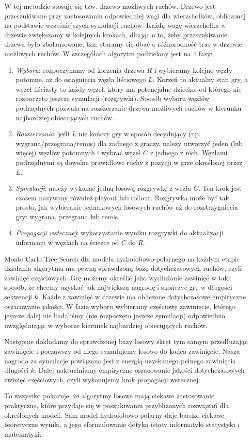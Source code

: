 \documentclass[leqno,10pt]{article}
\begin{document}
W tej metodzie stosuję się tzw. drzewo możliwych ruchów. Drzewo jest przeszukiwane przy zastosowaniu odpowiedniej wagi dla wierzchołków, obliczonej na podstawie wcześniejszych symulacji ruchów. Każdą wagę wierzchołka w drzewie zwiększamy w kolejnych krokach, dbając o to, żeby przeszukiwanie drzewa było zbalansowane, tzn. staramy się dbać o różnorodność tras w drzewie możliwych ruchów. W szczegółach algorytm podzielony jest na 4 fazy: 
\begin{enumerate}
\item \textit{Wyboru}: rozpoczynamy od korzenia drzewa $R$ i wybieramy kolejne węzły potomne, aż do osiągnięcia węzła liściowego $L$. Korzeń to aktualny stan gry, a węzeł liściasty to każdy węzeł, który ma potencjalne dziecko, od którego nie rozpoczęto jeszcze symulacji (rozgrywki). Sposób wyboru węzłów podrzędnych pozwala na rozszerzanie drzewa możliwych ruchów w kierunku najbardziej obiecujących ruchów.
\item \textit{Rozszerzania}: jeśli $L$ nie kończy gry w sposób decydujący (np. wygrana/przegrana/remis) dla żadnego z graczy, należy utworzyć jeden (lub więcej) węzłów potomnych i wybrać węzeł $C$ z jednego z nich. Węzłami podrzędnymi są dowolne prawidłowe ruchy z pozycji w grze określonej przez $L$.
\item  \textit{Symulacji}: należy wykonać jedną losową rozgrywkę z węzła $C$. Ten krok jest czasem nazywany również playout lub rollout. Rozgrywka może być tak prosta, jak wybieranie jednakowych losowych ruchów aż do rozstrzygnięcia gry: wygrana, przegrana lub remis.
\item \textit{Propagacji wstecznej}: wykorzystanie wyniku rozgrywki do aktualizacji informacji w węzłach na ścieżce od $C$ do $R$.
\end{enumerate}
Monte Carlo Tree Search dla modelu hydrofobowo-polarnego na każdym etapie działania algorytmu ma pewną sprawdzoną bazę dotychczasowych ruchów, czyli zawinięć częściowych. Grę możemy określić jako wydłużanie zawinięć w taki sposób, że chcemy uzyskać jak największą nagrodę i skończyć grę w długości sekwencji $k$. Każde z zawinięć w drzewie ma obliczone dotychczasowe empiryczne oszacowanie jakości. W fazie wyboru wybieramy częściowe zawinięcie, którego jeszcze dalej nie badaliśmy (nie rozpoczęto jeszcze symulacji) odpowiednio uwzględniając w wyborze kierunek najbardziej obiecujących ruchów. 

Następnie dokładamy do sprawdzonej bazy losowy skręt tym samym przedłużając zawinięcie i począwszy od niego symulujemy losowo do końca zawinięcie. Nasza nagroda za symulacje powiązana jest z energią uzyskanego pełnego zawinięcia długości $k$. Dalej uaktualniamy empiryczne oszacowanie jakości dotychczasowych zwinięć częściowych, czyli wykonujemy krok propagacji wstecznej.   

To wszystko pokazuje, że algorytmy losowe mają ciekawe zastosowanie praktyczne, które przydaje się w poszukiwaniu przybliżonych rozwiązań dla określonych modeli. Sam model hydrofobowo-polarny daje bardzo ciekawe teoretyczne wyniki, a jego sformułowanie dotyka istoty informatyki statystyki i matematyki.  
\end{document}
